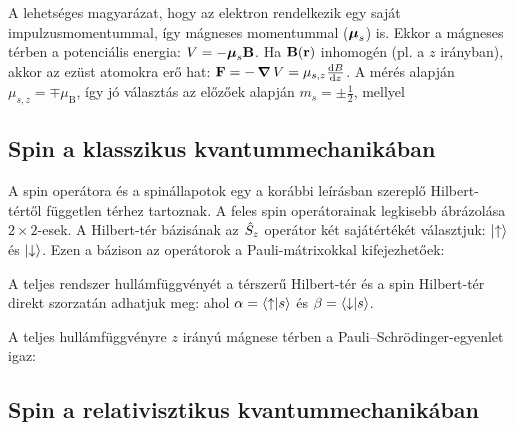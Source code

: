    A lehetséges magyarázat, hogy az elektron rendelkezik egy saját impulzusmomentummal, így mágneses momentummal ($\boldsymbol{\mu}_s$) is. Ekkor a mágneses térben a potenciális energia: $V=-\boldsymbol{\mu}_s \mathbf{B}$. Ha $\mathbf{B}(\mathbf{r})$ inhomogén (pl. a $z$ irányban), akkor az ezüst atomokra erő hat: $\mathbf{F}=-\mathop{\boldsymbol{\nabla}}\nolimits{V}=\mu_{s,z}\frac{\mathrm{d} B}{\mathrm{d} z}$. A mérés alapján $\mu_{s,z}=\mp\mu_\text{B}$, így jó választás az előzőek alapján $m_s=\pm\frac{1}{2}$, mellyel
   
  \subsection{Spin a klasszikus kvantummechanikában}
   
   A spin operátora és a spinállapotok egy a korábbi leírásban szereplő Hilbert-tértől független térhez tartoznak. A feles spin operátorainak legkisebb ábrázolása $2\times2$-esek. A Hilbert-tér bázisának az $\hat{S}_z$ operátor két sajátértékét választjuk: $\lvert\uparrow\rangle$ és $\lvert\downarrow\rangle$.  Ezen a bázison az operátorok a Pauli-mátrixokkal kifejezhetőek: 
   
   A teljes rendszer hullámfüggvényét a térszerű Hilbert-tér és a spin Hilbert-tér direkt szorzatán adhatjuk meg: 
   ahol $\alpha=\langle\uparrow\rvert s\rangle$ és $\beta=\langle\downarrow\rvert s\rangle$.
   
   A teljes hullámfüggvényre $z$ irányú mágnese térben a Pauli--Schrödinger-egyenlet igaz:
   
  \subsection{Spin a relativisztikus kvantummechanikában}
   
